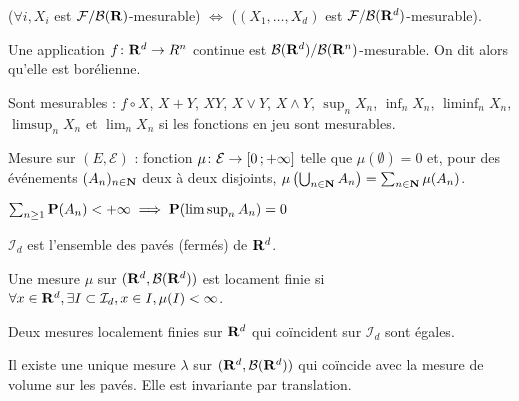 \begin{thm}
	($\forall i, X_i$ est $\mathcal{F}/\mathcal{B}(\mathbf{R})$-mesurable)
	$\iff$ ($(X_1,\ldots,X_d)$ est $\mathcal{F}/\mathcal{B}(\mathbf{R}^d)$-mesurable).
\end{thm}

\begin{thm}
	Une application $f \colon \mathbf{R}^d \to R^n$ continue est $\mathcal{B}(\mathbf{R}^d)/\mathcal{B}(\mathbf{R}^n)$-mesurable.
	On dit alors qu’elle est borélienne.
\end{thm}

\begin{cor}
	Sont mesurables : $f \circ X$, $X + Y$, $XY$, $X \vee Y$, $X \wedge Y$, $\sup_n X_n$, $\inf_n X_n$, $\liminf_n X_n$, $\limsup_n X_n$ et $\lim_n X_n$ si les fonctions en jeu sont mesurables.
\end{cor}

\begin{defn}
	Mesure sur $(E,\mathcal{E})$ : fonction $\mu \colon \mathcal{E} \to \mathopen{}\mathclose{\left[0\mathclose{}\mathpunct{};+\infty\right]}$ telle que $\mu(\emptyset) = 0$ et, pour des événements $(A_n)_{n \in \mathbf{N}}$ deux à deux disjoints, $\mu \left( \bigcup_{n \in \mathbf{N}} A_n \right) = \sum_{n \in \mathbf{N}} \mu(A_n)$.
\end{defn}

\begin{lem}
	$\sum_{n \geq 1} \mathbf{P}(A_n) < +\infty \implies \mathbf{P}(\limsup_n A_n) = 0$
\end{lem}

\begin{note}
	$\mathcal{I}_d$ est l'ensemble des pavés (fermés) de $\mathbf{R}^d$.
\end{note}

\begin{defn}
	Une mesure $\mu$ sur $(\mathbf{R}^d,\mathcal{B}(\mathbf{R}^d))$ est locament finie si $\forall x \in \mathbf{R}^d, \exists I \subset \mathcal{I}_d, x \in I, \mu(I) < \infty$.
\end{defn}

\begin{thm}
	Deux mesures localement finies sur $\mathbf{R}^d$ qui coïncident sur $\mathcal{I}_d$ sont égales.
\end{thm}

\begin{thm}
	Il existe une unique mesure $\lambda$ sur $(\mathbf{R}^d,\mathcal{B}(\mathbf{R}^d))$ qui coïncide avec la mesure de volume sur les pavés.
	Elle est invariante par translation.
\end{thm}

